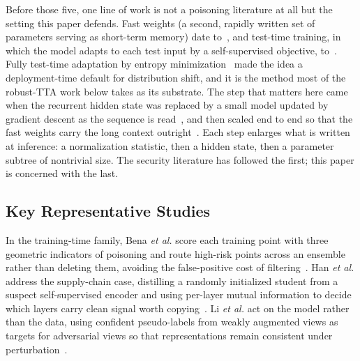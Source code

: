 \documentclass[journal]{IEEEtran}
\begin{document}
Before those five, one line of work is not a poisoning literature at all but the
setting this paper defends. Fast weights (a second, rapidly written set of
parameters serving as short-term memory) date to~\cite{ba2016fastweights}, and
test-time training, in which the model adapts to each test input by a
self-supervised objective, to~\cite{sun2020ttt}. Fully test-time adaptation
by entropy minimization~\cite{wang2021tent} made the idea a deployment-time default
for distribution shift, and it is the method most of the robust-TTA work below
takes as its substrate. The step that matters here came when the recurrent hidden
state was replaced by a small model updated by gradient descent as the sequence is
read~\cite{sun2024tttlayers}, and then scaled end to end so that the fast weights
carry the long context outright~\cite{tandon2025tttE2E}. Each step enlarges what is
written at inference: a normalization statistic, then a hidden state, then a
parameter subtree of nontrivial size. The security literature has followed the
first; this paper is concerned with the last.

\subsection{Key Representative Studies}

In the training-time family, Bena \emph{et al.} score each training point with three
geometric indicators of poisoning and route high-risk points across an ensemble
rather than deleting them, avoiding the false-positive cost of
filtering~\cite{bena2025risk}. Han \emph{et al.} address the supply-chain case,
distilling a randomly initialized student from a suspect self-supervised encoder and
using per-layer mutual information to decide which layers carry clean signal worth
copying~\cite{han2025mimic}. Li \emph{et al.} act on the model rather than the data,
using confident pseudo-labels from weakly augmented views as targets for adversarial
views so that representations remain consistent under perturbation~\cite{li2024ast}.
\end{document}
